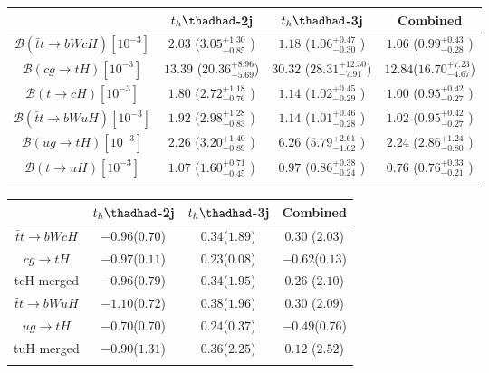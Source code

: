 \centering
\begin{tabular}{cccc} \toprule\toprule
 & $t_h\thadhad$-2j & $t_h\thadhad$-3j & Combined\\\midrule

$\mathcal{B}(\bar{t}t\to bWcH)[10^{-3}]$     & $2.03$  ($3.05^{+1.30}_{-0.85}$ )  & $1.18$  ($1.06^{+0.47}_{-0.30}$  )  & $1.06$ ($0.99^{+0.43}_{-0.28}$ )\\
$\mathcal{B}(cg\to tH)[10^{-3}]$             & $13.39$ ($20.36^{+8.96}_{-5.69}$)  & $30.32$ ($28.31^{+12.30}_{-7.91}$)  & $12.84$($16.70^{+7.23}_{-4.67}$)\\
$\mathcal{B}(t\to cH)[10^{-3}]$              & $1.80$   ($2.72^{+1.18}_{-0.76}$ ) & $1.14$  ($1.02^{+0.45}_{-0.29}$  )  & $1.00$ ($0.95^{+0.42}_{-0.27}$ )\\
$\mathcal{B}(\bar{t}t\to bWuH)[10^{-3}]$     & $1.92$  ($2.98^{+1.28}_{-0.83}$ )  & $1.14$  ($1.01^{+0.46}_{-0.28}$  )  & $1.02$ ($0.95^{+0.42}_{-0.27}$ )\\
$\mathcal{B}(ug\to tH)[10^{-3}]$             & $2.26$  ($3.20^{+1.40}_{-0.89}$ )  & $6.26$  ($5.79^{+2.61}_{-1.62}$  )  & $2.24$ ($2.86^{+1.24}_{-0.80}$ )\\
$\mathcal{B}(t\to uH)[10^{-3}]$    			 & $1.07$  ($1.60^{+0.71}_{-0.45}$ )  & $0.97$  ($0.86^{+0.38}_{-0.24}$  )  & $0.76$ ($0.76^{+0.33}_{-0.21}$ )\\
\bottomrule\bottomrule\\
\end{tabular}




\centering
\begin{tabular}{cccc} \toprule\toprule
 & $t_h\thadhad$-2j & $t_h\thadhad$-3j & Combined\\\midrule
$\bar{t}t\to bWcH$ & $-0.96$($0.70$) & $0.34$($1.89$)& $0.30$ ($2.03$)\\
$cg\to tH$         & $-0.97$($0.11$) & $0.23$($0.08$)& $-0.62$($0.13$)\\
tcH merged         & $-0.96$($0.79$) & $0.34$($1.95$)& $0.26$ ($2.10$)\\
$\bar{t}t\to bWuH$ & $-1.10$($0.72$) & $0.38$($1.96$)& $0.30$ ($2.09$)\\
$ug\to tH$         & $-0.70$($0.70$) & $0.24$($0.37$)& $-0.49$($0.76$)\\
tuH merged         & $-0.90$($1.31$) & $0.36$($2.25$)& $0.12$ ($2.52$)\\
\bottomrule\bottomrule\\
\end{tabular}


